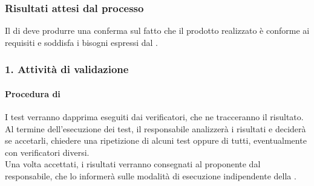 \subsubsection{Risultati attesi dal processo}
Il  di  deve produrre una conferma sul fatto che il prodotto realizzato è conforme ai requisiti e soddisfa i bisogni espressi dal .

\subsubsection{1. Attività di validazione}
\paragraph*{Procedura di }
I test verranno dapprima eseguiti dai verificatori, che ne tracceranno il risultato. Al termine dell'esecuzione dei test, il responsabile analizzerà i risultati e deciderà se accetarli, chiedere una ripetizione di alcuni test oppure di tutti, eventualmente con verificatori diversi. \\
Una volta accettati, i risultati verranno consegnati al proponente dal responsabile, che lo informerà sulle modalità di esecuzione indipendente della .
